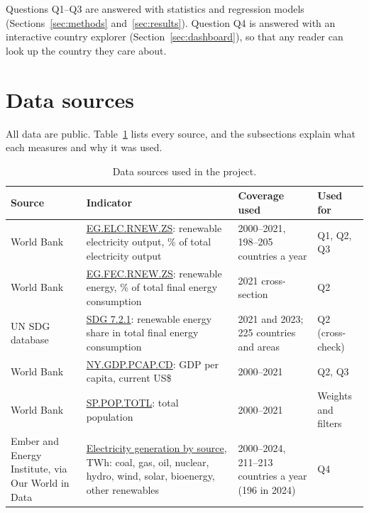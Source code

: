 \documentclass[11pt,a4paper]{article}
\begin{document}
Questions Q1--Q3 are answered with statistics and regression models (Sections~\ref{sec:methods} and~\ref{sec:results}). Question Q4 is answered with an interactive country explorer (Section~\ref{sec:dashboard}), so that any reader can look up the country they care about.

\section{Data sources}\label{sec:data}

All data are public. Table~\ref{tab:sources} lists every source, and the subsections explain what each measures and why it was used.

\begin{table}[H]
\centering\small
\caption{Data sources used in the project.}\label{tab:sources}
\begin{tabularx}{\textwidth}{@{}p{3.1cm}Xp{2.7cm}p{1.9cm}@{}}
\toprule
\textbf{Source} & \textbf{Indicator} & \textbf{Coverage used} & \textbf{Used for} \\
\midrule
World Bank \citep{wb_elc_rnew} & \href{https://data.worldbank.org/indicator/EG.ELC.RNEW.ZS}{EG.ELC.RNEW.ZS}: renewable electricity output, \% of total electricity output & 2000--2021, 198--205 countries a year & Q1, Q2, Q3 \\
World Bank \citep{wb_fec_rnew} & \href{https://data.worldbank.org/indicator/EG.FEC.RNEW.ZS}{EG.FEC.RNEW.ZS}: renewable energy, \% of total final energy consumption & 2021 cross-section & Q2 \\
UN SDG database \citep{un_sdg_db,un_721_meta} & \href{https://unstats.un.org/sdgs/metadata/files/Metadata-07-02-01.pdf}{SDG 7.2.1}: renewable energy share in total final energy consumption & 2021 and 2023; 225 countries and areas & Q2 (cross-check) \\
World Bank \citep{wb_gdppc} & \href{https://data.worldbank.org/indicator/NY.GDP.PCAP.CD}{NY.GDP.PCAP.CD}: GDP per capita, current US\$ & 2000--2021 & Q2, Q3 \\
World Bank \citep{wb_pop} & \href{https://data.worldbank.org/indicator/SP.POP.TOTL}{SP.POP.TOTL}: total population & 2000--2021 & Weights and filters \\
Ember and Energy Institute, via Our World in Data \citep{ember,ei_review,owid_energy_repo} & \href{https://github.com/owid/energy-data}{Electricity generation by source}, TWh: coal, gas, oil, nuclear, hydro, wind, solar, bioenergy, other renewables & 2000--2024, 211--213 countries a year (196 in 2024) & Q4 \\
\bottomrule
\end{tabularx}
\end{table}
\end{document}
